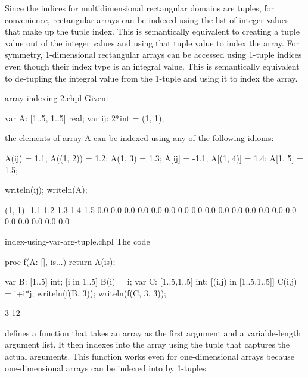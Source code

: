 Since the indices for multidimensional rectangular domains are tuples,
for convenience, rectangular arrays can be indexed using the list of
integer values that make up the tuple index.  This is semantically
equivalent to creating a tuple value out of the integer values and
using that tuple value to index the array.  For symmetry,
1-dimensional rectangular arrays can be accessed using 1-tuple indices
even though their index type is an integral value.  This is
semantically equivalent to de-tupling the integral value from the
1-tuple and using it to index the array.

\begin{chapelexample}{array-indexing-2.chpl}
Given:
\begin{chapel}
var A: [1..5, 1..5] real;
var ij: 2*int = (1, 1);
\end{chapel}
the elements of array A can be indexed using any of the following
idioms:
\begin{chapel}
A(ij) = 1.1;
A((1, 2)) = 1.2;
A(1, 3) = 1.3;
A[ij] = -1.1;
A[(1, 4)] = 1.4;
A[1, 5] = 1.5;
\end{chapel}
\begin{chapelpost}
writeln(ij);
writeln(A);
\end{chapelpost}
\begin{chapeloutput}
(1, 1)
-1.1 1.2 1.3 1.4 1.5
0.0 0.0 0.0 0.0 0.0
0.0 0.0 0.0 0.0 0.0
0.0 0.0 0.0 0.0 0.0
0.0 0.0 0.0 0.0 0.0
\end{chapeloutput}
\end{chapelexample}

\begin{chapelexample}{index-using-var-arg-tuple.chpl}
The code
\begin{chapel}
proc f(A: [], is...)
  return A(is);
\end{chapel}
\begin{chapelpost}
var B: [1..5] int;
[i in 1..5] B(i) = i;
var C: [1..5,1..5] int;
[(i,j) in [1..5,1..5]] C(i,j) = i+i*j;
writeln(f(B, 3));
writeln(f(C, 3, 3));
\end{chapelpost}
\begin{chapeloutput}
3
12
\end{chapeloutput}
defines a function that takes an array as the first argument and a
variable-length argument list.  It then indexes into the array using
the tuple that captures the actual arguments.  This function works
even for one-dimensional arrays because one-dimensional arrays can be
indexed into by 1-tuples.
\end{chapelexample}


